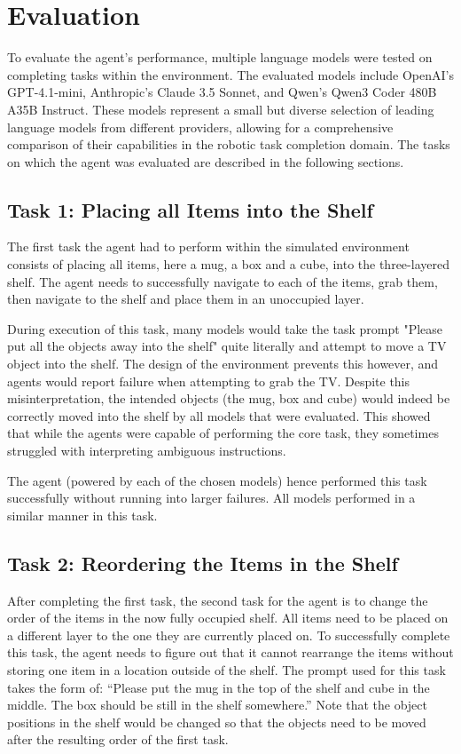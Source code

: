 \documentclass[../report.tex]{subfiles}
\begin{document}
\section{Evaluation}
\label{sec:evaluation}
To evaluate the agent's performance, multiple language models were tested on completing tasks within the environment. The evaluated models include OpenAI's GPT-4.1-mini, Anthropic's Claude 3.5 Sonnet, and Qwen's Qwen3 Coder 480B A35B Instruct. These models represent a small but diverse selection of leading language models from different providers, allowing for a comprehensive comparison of their capabilities in the robotic task completion domain. The tasks on which the agent was evaluated are described in the following sections.

\subsection{Task 1: Placing all Items into the Shelf}
The first task the agent had to perform within the simulated environment consists of placing all items, here a mug, a box and a cube, into the three-layered shelf. The agent needs to successfully navigate to each of the items, grab them, then navigate to the shelf and place them in an unoccupied layer.

During execution of this task, many models would take the task prompt "Please put all the objects away into the shelf" quite literally and attempt to move a TV object into the shelf. The design of the environment prevents this however, and agents would report failure when attempting to grab the TV. Despite this misinterpretation, the intended objects (the mug, box and cube) would indeed be correctly moved into the shelf by all models that were evaluated. This showed that while the agents were capable of performing the core task, they sometimes struggled with interpreting ambiguous instructions.

The agent (powered by each of the chosen models) hence performed this task successfully without running into larger failures. All models performed in a similar manner in this task.

\subsection{Task 2: Reordering the Items in the Shelf}
After completing the first task, the second task for the agent is to change the order of the items in the now fully occupied shelf. All items need to be placed on a different layer to the one they are currently placed on. To successfully complete this task, the agent needs to figure out that it cannot rearrange the items without storing one item in a location outside of the shelf. The prompt used for this task takes the form of: ``Please put the mug in the top of the shelf and cube in the middle. The box should be still in the shelf somewhere.'' Note that the object positions in the shelf would be changed so that the objects need to be moved after the resulting order of the first task.
\end{document}
